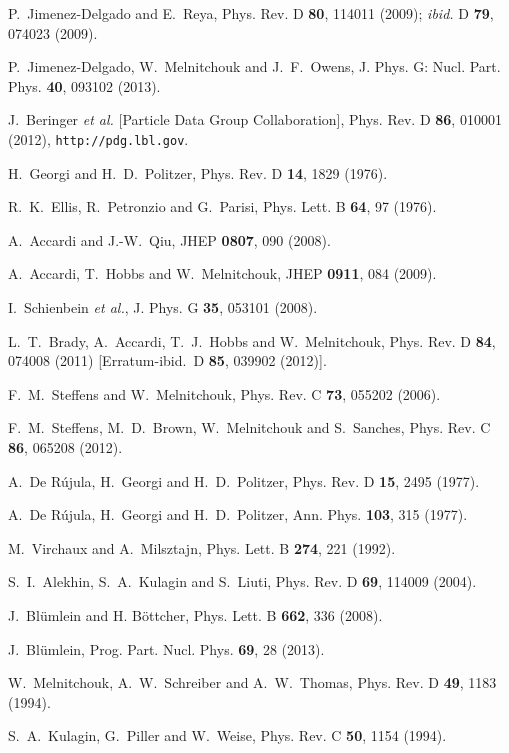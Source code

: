 \documentclass[aps,prd,amsmath,preprint]{revtex4}
\begin{document}
\begin{thebibliography}{99}
P.~Jimenez-Delgado and E.~Reya,
Phys. Rev. D {\bf 80}, 114011 (2009);
{\it ibid.} D {\bf 79}, 074023 (2009).

P.~Jimenez-Delgado, W.~Melnitchouk and J.~F.~Owens,
J. Phys. G: Nucl. Part. Phys. {\bf 40}, 093102 (2013).

J.~Beringer {\it et al.} [Particle Data Group Collaboration],
Phys. Rev. D {\bf 86}, 010001 (2012),
{\tt http://pdg.lbl.gov}.

H.~Georgi and H.~D.~Politzer,
Phys. Rev. D {\bf 14}, 1829 (1976).

R.~K.~Ellis, R.~Petronzio and G.~Parisi,
Phys. Lett. B {\bf 64}, 97 (1976).

A.~Accardi and J.-W.~Qiu,
JHEP {\bf 0807}, 090 (2008).

A.~Accardi, T.~Hobbs and W.~Melnitchouk,
JHEP {\bf 0911}, 084 (2009).

I.~Schienbein {\it et al.},
J. Phys. G {\bf 35}, 053101 (2008).

L.~T.~Brady, A.~Accardi, T.~J.~Hobbs and W.~Melnitchouk,
Phys. Rev. D {\bf 84}, 074008 (2011)
[Erratum-ibid.\ D {\bf 85}, 039902 (2012)].

F.~M.~Steffens and W.~Melnitchouk,
Phys. Rev. C {\bf 73}, 055202 (2006).

F.~M.~Steffens, M.~D.~Brown, W.~Melnitchouk and S.~Sanches,
Phys. Rev. C {\bf 86}, 065208 (2012).

A.~De R\'ujula, H.~Georgi and H.~D.~Politzer,
Phys. Rev. D {\bf 15}, 2495 (1977).

A.~De R\'ujula, H.~Georgi and H.~D.~Politzer,
Ann. Phys. {\bf 103}, 315 (1977).

M.~Virchaux and A.~Milsztajn,
Phys. Lett. B {\bf 274}, 221 (1992).

S.~I.~Alekhin, S.~A.~Kulagin and S.~Liuti,
Phys. Rev. D {\bf 69}, 114009 (2004).

J.~Bl\"umlein and H. B\"ottcher,
Phys. Lett. B {\bf 662}, 336 (2008).

J.~Bl\"umlein,
Prog. Part. Nucl. Phys. {\bf 69}, 28 (2013).

W.~Melnitchouk, A.~W.~Schreiber and A.~W.~Thomas,
Phys. Rev. D {\bf 49}, 1183 (1994).

S.~A.~Kulagin, G.~Piller and W.~Weise,
Phys. Rev. C {\bf 50}, 1154 (1994).


\end{thebibliography}
\end{document}
